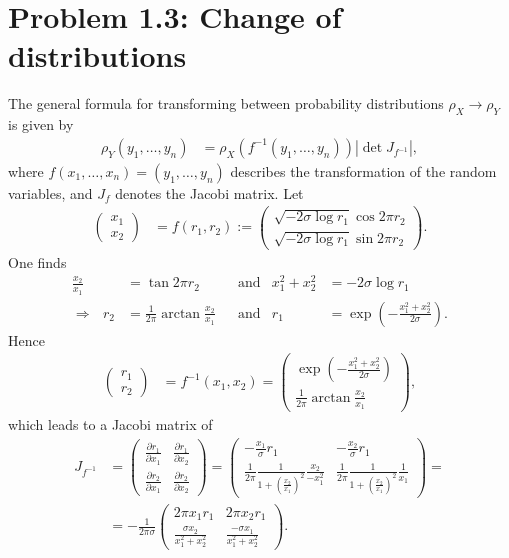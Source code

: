 \documentclass[english, parskip=full]{scrartcl}
\newcommand{\kla}{}
\newcommand{\tecxt}{}
\begin{document}
\section*{Problem 1.3: Change of distributions}
The general formula for transforming between probability distributions $\rho_X\rightarrow\rho_Y$ is given by
\begin{align}
\rho_Y(y_1,\dots,y_n)&=\rho_X\kla\left( f^{-1}(y_1,\dots,y_n) \right)\left\vert\det J_{f^{-1}}\right\vert,
\end{align}
where $f(x_1,\dots,x_n)=(y_1,\dots,y_n)$ describes the transformation of the random variables, and $J_f$ denotes the Jacobi matrix.
Let 
\begin{align}
\begin{pmatrix}
x_1 \\ x_2
\end{pmatrix}&=f(r_1, r_2):=\begin{pmatrix}
\sqrt{-2\sigma\log r_1}\cos 2\pi r_2 \\ \sqrt{-2\sigma\log r_1}\sin 2\pi r_2
\end{pmatrix}.
\end{align}
One finds
\begin{align}
\frac{x_2}{x_1}&=\tan 2\pi r_2&&\tecxt\text{and}&x_1^2+x_2^2&=-2\sigma\log r_1\\
\Rightarrow\ \ \ r_2&=\frac{1}{2\pi}\arctan\frac{x_2}{x_1} && \tecxt\text{and}&r_1&=\exp\kla\left( -\frac{x_1^2+x_2^2}{2\sigma} \right).
\end{align}
Hence
\begin{align}
\begin{pmatrix}
r_1 \\ r_2
\end{pmatrix}&= f^{-1}(x_1,x_2)=\begin{pmatrix}
\exp\kla\left( -\frac{x_1^2+x_2^2}{2\sigma} \right) \\ \frac{1}{2\pi}\arctan\frac{x_2}{x_1}
\end{pmatrix},
\end{align}
which leads to a Jacobi matrix of
\begin{align}
J_{f^{-1}}&=\begin{pmatrix}
\frac{\partial r_1}{\partial x_1} & \frac{\partial r_1}{\partial x_2} \\
\frac{\partial r_2}{\partial x_1} & \frac{\partial r_2}{\partial x_2}
\end{pmatrix}=\begin{pmatrix}
-\frac{x_1}{\sigma}r_1 & -\frac{x_2}{\sigma}r_1 \\ 
\frac{1}{2\pi}\frac{1}{1+\kla\left( \frac{x_2}{x_1} \right)^2}\frac{x_2}{-x_1^2} & \frac{1}{2\pi}\frac{1}{1+\kla\left( \frac{x_2}{x_1} \right)^2}\frac{1}{x_1}
\end{pmatrix}=\\
&=-\frac{1}{2\pi\sigma}\begin{pmatrix}
2\pi x_1r_1 & 2\pi x_2r_1 \\ 
\frac{\sigma x_2}{x_1^2+x_2^2} & \frac{-\sigma x_1}{x_1^2+x_2^2}
\end{pmatrix}.
\end{align}
\end{document}
